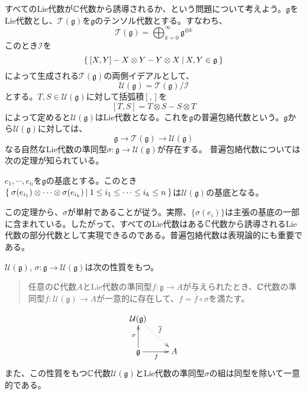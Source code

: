 \documentclass{ltjsreport}
\begin{document}
すべてのLie代数が$\mathbb{C}$代数から誘導されるか、という問題について考えよう。$\mathfrak{g}$をLie代数とし、$\mathcal{T}(\mathfrak{g})$を$\mathfrak{g}$のテンソル代数とする。すなわち、
\[
\mathcal{T}(\mathfrak{g})=\bigoplus_{k=0}^\infty\mathfrak{g}^{\otimes k}  
\]
このとき$\mathcal{I}$を
\[
\left\{\:[X,Y]-X\otimes Y-Y\otimes X\:\middle|\:X,Y\in\mathfrak{g}\:\right\}  
\]
によって生成される$\mathcal{T}(\mathfrak{g})$の両側イデアルとして、
\[
\mathcal{U}(\mathfrak{g})=\mathcal{T}(\mathfrak{g})/\mathcal{I}  
\]
とする。$T,S\in\mathcal{U}(\mathfrak{g})$に対して括弧積$[,]$を
\[
[T,S]=T\otimes S-S\otimes T  
\]
によって定めると$\mathcal{U}(\mathfrak{g})$はLie代数となる。これを$\mathfrak{g}$の普遍包絡代数という。$\mathfrak{g}$から$\mathcal{U}(\mathfrak{g})$に対しては、
\[
\mathfrak{g}\rightarrow \mathcal{T}(\mathfrak{g})\rightarrow \mathcal{U}(\mathfrak{g})  
\]
なる自然なLie代数の準同型$\sigma:\mathfrak{g}\rightarrow\mathcal{U}(\mathfrak{g})$が存在する。
普遍包絡代数については次の定理が知られている。

\begin{theo}
  $e_1,\cdots,e_n$を$\mathfrak{g}$の基底とする。このとき\\
  $\left\{\:\sigma(e_{i_1})\otimes\cdots\otimes\sigma(e_{i_k})\:\middle|\:1\leq i_1\leq\cdots\leq i_k\leq n\:\right\}$は$\mathcal{U}(\mathfrak{g})$の基底となる。
\end{theo}

この定理から、$\sigma$が単射であることが従う。実際、$\{\sigma(e_i)\}$は主張の基底の一部に含まれている。したがって、すべてのLie代数はある$\mathbb{C}$代数から誘導されるLie代数の部分代数として実現できるのである。普遍包絡代数は表現論的にも重要である。

\begin{prop}[普遍包絡代数の普遍性]
  $\mathcal{U}(\mathfrak{g})$, $\sigma:\mathfrak{g}\rightarrow\mathcal{U}(\mathfrak{g})$は次の性質をもつ。
  \begin{quote}
    任意の$\mathbb{C}$代数$A$とLie代数の準同型$f:\mathfrak{g}\rightarrow A$が与えられたとき、$\mathbb{C}$代数の準同型$\overline{f}:\mathcal{U}(\mathfrak{g})\rightarrow A$が一意的に存在して、$f=\overline{f}\circ\sigma$を満たす。
  \end{quote}
  \[
  \xymatrix{
  \mathcal{U}(\mathfrak{g}) \ar@{.>}[rd]^{\overline{f}} \\
  \mathfrak{g} \ar[u]^{\sigma} \ar[r]_f & A
  }
  \]
  また、この性質をもつ$\mathbb{C}$代数$\mathcal{U}(\mathfrak{g})$とLie代数の準同型$\sigma$の組は同型を除いて一意的である。
\end{prop}
\end{document}
